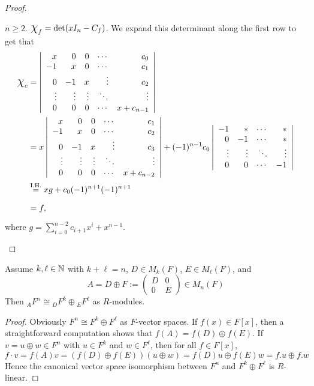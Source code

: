 \documentclass[11pt]{book}
\theoremstyle{definition}   \newtheorem{defn}[counter]{Definition} %
\newcommand{\mymatrix}[2]{\left( \begin{array}{#1} #2 \end{array} \right)}
\newcommand{\mydet}[2]{\left| \begin{array}{#1} #2 \end{array} \right|} \newcommand{\myvec}[1]{\left( \begin{array}{c} #1 \end{array} \right)}
\newcommand{\Chi}{\mbox{\Large $\chi$}}
\newcommand{\vs}{\vspace{8pt}}
\numberwithin{counter}{chapter}
\begin{document}
\begin{proof}
\begin{enumerate}
$n \geq 2$. $\Chi_f = \det (xI_n - C_f)$. We expand this determinant along the first row to get that
\begin{align*}
\Chi_c &= \mydet{rrrrr}{x & 0 & 0 & \cdots & c_0 \\
                       -1 & x & 0 & \cdots & c_1 \\
                       0 & -1 & x & \vdots  & c_2\\
                       \vdots & \vdots & \vdots & \ddots & \vdots \\
                       0 & 0 & 0 & \cdots & x + c_{n-1}} \\
                       &= x \mydet{rrrrr}{x & 0 & 0 & \cdots & c_1 \\
                                              -1 & x & 0 & \cdots & c_2 \\
                                              0 & -1 & x & \vdots  & c_3\\
                                              \vdots & \vdots & \vdots & \ddots & \vdots \\
                                              0 & 0 & 0 & \cdots & x + c_{n-2}} + (-1)^{n-1} c_0 \mydet{rrrr}{-1 & \ast & \cdots & \ast \\
                                                           0 & -1 & \cdots & \ast \\
                                                           \vdots & \vdots & \ddots & \vdots \\
                                                           0 & 0 & \cdots & -1} \\
        &\overset{\tn{I.H.}}{=} x g + c_0 (-1)^{n+1} (-1)^{n+1} \\
        &= f,
\end{align*}
where $g = \sum_{i=0}^{n-2} c_{i+1} x^i + x^{n-1}$.
\end{enumerate}
\end{proof}

\vs

\begin{lemma}
Assume $k,\ell \in \operatorname{\mathbb{N}}$ with $k + \ell = n$, $D \in M_k(F)$, $E \in M_\ell(F)$, and
	\[A = D \oplus F := \mymatrix{cc}{D & 0 \\ 0 & E} \in M_n(F) \]
Then ${_AF^n} \cong {_DF^k} \oplus {_EF^\ell}$ as $R$-modules.
\end{lemma}

\begin{proof}
Obviously $F^n \cong F^k \oplus F^\ell$ as $F$-vector spaces. If $f(x) \in F[x]$, then a straightforward computation shows that $f(A) = f(D) \oplus f(E)$. If $v = u \oplus w \in F^n$ with $u \in F^k$ and $w \in F^\ell$, then for all $f \in F[x]$,
	\[f \cdot v = f(A) v = (f(D) \oplus f(E)) (u \oplus w) = f(D)u \oplus f(E)w = f.u \oplus f.w \]
Hence the canonical vector space isomorphism between $F^n$ and $F^k \oplus F^\ell$ is $R$-linear.
\end{proof}
\end{document}
